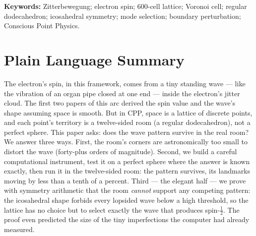 \documentclass[12pt]{article}
\begin{document}
\begin{abstract}
shifted $0.31\%$ from the sphere).  The lattice cell's icosahedral
anisotropy does not disturb the mode topology the captured DP anchors
to.  \textbf{Proved here (V0.2), the analytic leg:} the icosahedral
rotation group admits \emph{no} invariant spherical harmonic for
$1 \le l \le 5$ (exact character counts), so the cell's anisotropy
lives entirely in $l = 6, 10, 12, \ldots$ (measured on the actual
cell: $\epsilon_6 = 0.051$, forbidden channels at the quadrature
floor); within the invariant sector the first anisotropy-carrying mode
sits at $kR = 8.211$, far above Mode 2's $3\pi/2 = 4.712$, so
\emph{the second invariant mode of the true cell is the anchoring
mode --- the lattice must choose Mode 2} (Selection Theorem); and the
radial family's fractional node/antinode positions are protected to
$O(\epsilon_6^2)$ (Protection Theorem), with the predicted
$\epsilon_6^2 = 0.0026$ matching the measured $0.0031$ eigenvalue
residual to $20\%$.  What remains registered is only a
non-perturbative-in-$\epsilon_6$ bound --- a rigor upgrade, not a gap
in the physical argument.
\end{abstract}

\noindent\textbf{Keywords:} Zitterbewegung; electron spin; 600-cell
lattice; Voronoi cell; regular dodecahedron; icosahedral symmetry;
mode selection; boundary perturbation; Conscious Point Physics.

\section*{Plain Language Summary}
The electron's spin, in this framework, comes from a tiny standing wave
--- like the vibration of an organ pipe closed at one end --- inside the
electron's jitter cloud.  The first two papers of this arc derived the
spin value and the wave's shape assuming space is smooth.  But in CPP,
space is a lattice of discrete points, and each point's territory is a
twelve-sided room (a regular dodecahedron), not a perfect sphere.  This
paper asks: does the wave pattern survive in the real room?  We answer
three ways.  First, the room's corners are astronomically too small to
distort the wave (forty-plus orders of magnitude).  Second, we build a
careful computational instrument, test it on a perfect sphere where the
answer is known exactly, then run it in the twelve-sided room: the
pattern survives, its landmarks moving by less than a tenth of a
percent.  Third --- the elegant half --- we prove with symmetry
arithmetic that the room \emph{cannot} support any competing pattern:
the icosahedral shape forbids every lopsided wave below a high
threshold, so the lattice has no choice but to select exactly the wave
that produces spin-$\tfrac12$.  The proof even predicted the size of the
tiny imperfections the computer had already measured.
\end{document}
